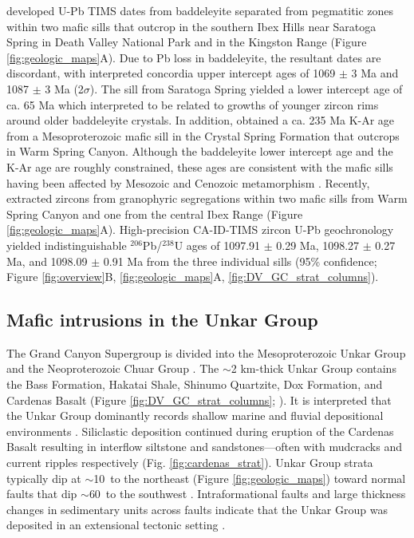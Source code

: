 \documentclass[draft]{agujournal2019}
\begin{document}
 developed U-Pb TIMS dates from baddeleyite separated from pegmatitic zones within two mafic sills that outcrop in the southern Ibex Hills near Saratoga Spring in Death Valley National Park and in the Kingston Range (Figure \ref{fig:geologic_maps}A). Due to Pb loss in baddeleyite, the resultant dates are discordant, with interpreted concordia upper intercept ages of 1069 $\pm$ 3 Ma and 1087 $\pm$ 3 Ma (2$\sigma$). The sill from Saratoga Spring yielded a lower intercept age of ca. 65 Ma which  interpreted to be related to growths of younger zircon rims around older baddeleyite crystals. In addition,  obtained a ca. 235 Ma K-Ar age from a Mesoproterozoic mafic sill in the Crystal Spring Formation that outcrops in Warm Spring Canyon. Although the baddeleyite lower intercept age and the K-Ar age are roughly constrained, these ages are consistent with the mafic sills having been affected by Mesozoic and Cenozoic metamorphism \cite{Snow1989a, Snow2000a}. Recently,  extracted zircons from granophyric segregations within two mafic sills from Warm Spring Canyon and one from the central Ibex Range (Figure \ref{fig:geologic_maps}A). High-precision CA-ID-TIMS zircon U-Pb geochronology yielded indistinguishable $^{206}$Pb/$^{238}$U ages of 1097.91  $\pm$  0.29 Ma, 1098.27  $\pm$  0.27 Ma, and 1098.09  $\pm$  0.91 Ma from the three individual sills (95\% confidence; Figure \ref{fig:overview}B, \ref{fig:geologic_maps}A, \ref{fig:DV_GC_strat_columns}). 

\subsection*{Mafic intrusions in the Unkar Group}

The Grand Canyon Supergroup is divided into the Mesoproterozoic Unkar Group and the Neoproterozoic Chuar Group \cite{Gundy1951a, Elston1989a, Dehler2017a}. The $\sim$2 km-thick Unkar Group contains the Bass Formation, Hakatai Shale, Shinumo Quartzite, Dox Formation, and Cardenas Basalt (Figure \ref{fig:DV_GC_strat_columns}; ). It is interpreted that the Unkar Group dominantly records shallow marine and fluvial depositional environments \cite{Elston1989a, Sears1990a, Hendricks1989a, Timmons2005a}. Siliclastic deposition continued during eruption of the Cardenas Basalt resulting in interflow siltstone and sandstones---often with mudcracks and current ripples respectively  (Fig. \ref{fig:cardenas_strat}). Unkar Group strata typically dip at $\sim$10\textdegree\ to the northeast (Figure \ref{fig:geologic_maps}) toward normal faults that dip $\sim$60\textdegree\ to the southwest \cite{Sears1973a, Timmons2012a}. Intraformational faults and large thickness changes in sedimentary units across faults indicate that the Unkar Group was deposited in an extensional tectonic setting \cite{Sears1990a, Karlstrom1998a, Timmons2001a}. 
\end{document}
